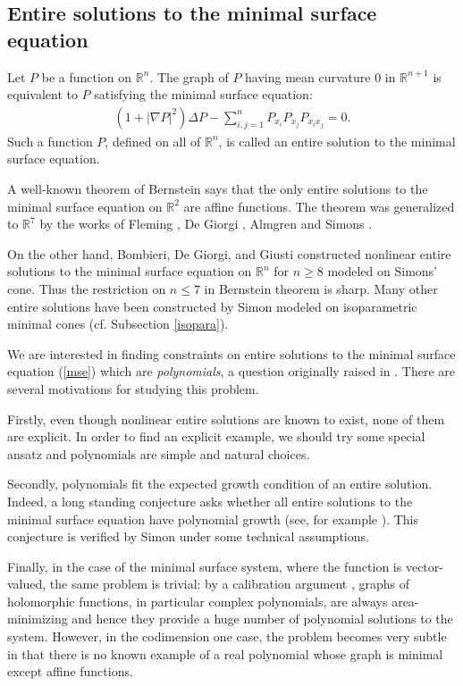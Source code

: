 \documentclass[pdflatex,sn-mathphys-num]{sn-jnl}%
\theoremstyle{thmstyleone}%
\theoremstyle{thmstyletwo}%
\theoremstyle{thmstylethree}%
\newcommand{\R}{\mathbb{R}}
\begin{document}
\subsection{Entire solutions to the minimal surface equation}
Let $P$ be a function on $\R^n$. The graph of $P$ having mean curvature $0$ in $\R^{n+1}$ is equivalent to $P$ satisfying the minimal surface equation:
\begin{align}
	\label{mse}
	(1+|\nabla P|^2)\Delta P-\sum_{i,j=1}^n  P_{x_i}  P_{x_j}  P_{x_ix_j}=0.
\end{align}
Such a function $P$, defined on all of $\R^n$, is called an entire solution to the minimal surface equation.

A well-known theorem of Bernstein \cite{B} says that the only entire solutions to the minimal surface equation on $\R^2$ are affine functions. The theorem was generalized to $\R^7$ by the works of Fleming \cite{fleming1962oriented}, De Giorgi \cite{de1965estensione},  Almgren \cite{almgren1966some} and Simons \cite{simons1968minimal}.

On the other hand, Bombieri, De Giorgi, and Giusti \cite{bombieri1969minimal} constructed nonlinear entire solutions to the minimal surface equation on $\R^n$ for $n\ge 8$ modeled on Simons' cone. Thus the restriction on $n\le 7$ in Bernstein theorem is sharp. Many other entire solutions have been constructed by Simon \cite{simon1989entire} modeled on isoparametric minimal cones (cf. Subsection \ref{isopara}).

We are interested in finding constraints on entire solutions to the minimal surface equation (\ref{mse}) which are \textit{polynomials}, a question originally raised in \cite{simon1997minimal}. There are several motivations for studying this problem. 


Firstly, even though nonlinear entire solutions are known to exist, none of them are explicit. In order to find an explicit example, we should try some special ansatz and polynomials are simple and natural choices.

Secondly, polynomials fit the expected growth condition of an entire solution. Indeed, a long standing conjecture asks whether all entire solutions to the minimal surface equation have polynomial growth (see, for example \cite{bombieri1972harnack,simon1997minimal,Yau}). This conjecture is verified by Simon \cite{simon1989entire} under some technical assumptions.

Finally, in the case of the minimal surface system, where the function is vector-valued, the same problem is trivial: by a calibration argument \cite[5.4.19]{Fed}, graphs of holomorphic functions, in particular complex polynomials, are always area-minimizing and hence they provide a huge number of polynomial solutions to the system. However, in the codimension one case, the problem becomes very subtle in that there is no known example of a real polynomial whose graph is minimal except affine functions.
\end{document}
